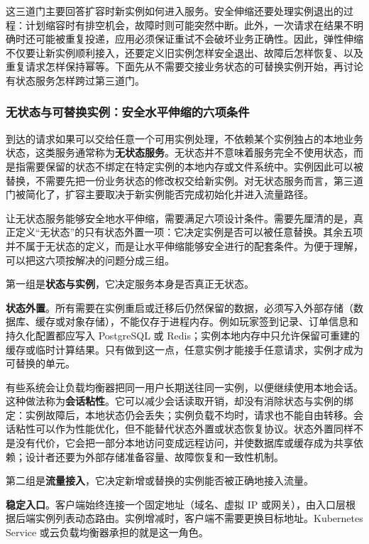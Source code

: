 这三道门主要回答扩容时新实例如何进入服务。安全伸缩还要处理实例退出的过程：计划缩容时有排空机会，故障时则可能突然中断。此外，一次请求在结果不明确时还可能被重复投递，应用必须保证重试不会破坏业务正确性。因此，弹性伸缩不仅要让新实例顺利接入，还要定义旧实例怎样安全退出、故障后怎样恢复、以及重复请求怎样保持幂等。下面先从不需要交接业务状态的可替换实例开始，再讨论有状态服务怎样跨过第三道门。

\subsubsection{无状态与可替换实例：安全水平伸缩的六项条件}

到达的请求如果可以交给任意一个可用实例处理，不依赖某个实例独占的本地业务状态，这类服务通常称为\textbf{无状态服务}。无状态并不意味着服务完全不使用状态，而是指需要保留的状态不绑定在特定实例的本地内存或文件系统中。实例因此可以被替换，不需要先把一份业务状态的修改权交给新实例。对无状态服务而言，第三道门被简化了，扩容主要取决于新实例能否完成初始化并进入流量路径。

让无状态服务能够安全地水平伸缩，需要满足六项设计条件。需要先厘清的是，真正定义“无状态”的只有状态外置一项：它决定实例是否可以被任意替换。其余五项并不属于无状态的定义，而是让水平伸缩能够安全进行的配套条件。为便于理解，可以把这六项按解决的问题分成三组。

第一组是\textbf{状态与实例}，它决定服务本身是否真正无状态。

\textbf{状态外置}。所有需要在实例重启或迁移后仍然保留的数据，必须写入外部存储（数据库、缓存或对象存储），不能仅存于进程内存。例如玩家签到记录、订单信息和持久化配置都应写入 PostgreSQL 或 Redis；实例本地内存中只允许保留可重建的缓存或临时计算结果。只有做到这一点，任意实例才能接手任意请求，实例才成为可替换的单元。

有些系统会让负载均衡器把同一用户长期送往同一实例，以便继续使用本地会话。这种做法称为\textbf{会话粘性}。它可以减少会话读取开销，却没有消除状态与实例的绑定：实例故障后，本地状态仍会丢失；实例负载不均时，请求也不能自由转移。会话粘性可以作为性能优化，但不能替代状态外置或状态恢复协议。状态外置同样不是没有代价，它会把一部分本地访问变成远程访问，并使数据库或缓存成为共享依赖；设计者还要为外部存储准备容量、故障恢复和一致性机制。

第二组是\textbf{流量接入}，它决定新增或替换的实例能否被正确地接入流量。

\textbf{稳定入口}。客户端始终连接一个固定地址（域名、虚拟 IP 或网关），由入口层根据后端实例列表动态路由。实例增减时，客户端不需要更换目标地址。Kubernetes Service 或云负载均衡器承担的就是这一角色。

